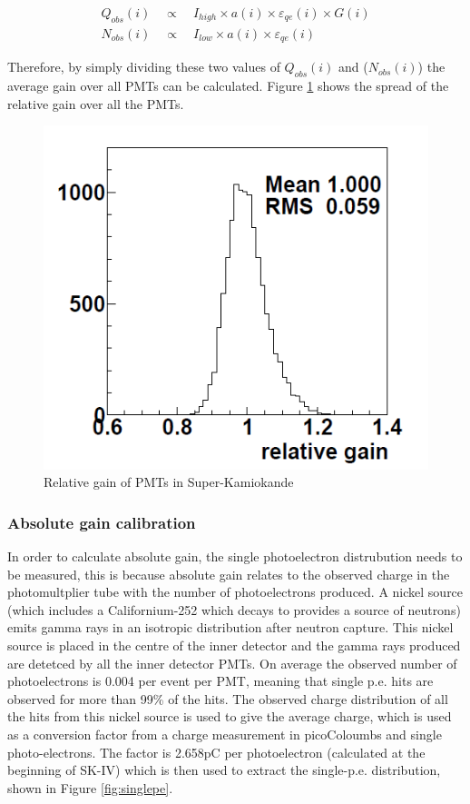 \begin{align}
Q_{o b s}(i) \quad \propto \quad I_{high} \times a(i) \times \varepsilon_{q e}(i) \times G(i) \\
N_{o b s}(i) \quad \propto \quad I_{low} \times a(i) \times \varepsilon_{q e}(i)
\end{align}
\label{eq:gaineq}

Therefore, by simply dividing these two values of $Q_{o b s}(i)$ and ($N_{o b s}(i)$) the average gain over all PMTs can be calculated.  Figure \ref{fig:relativegain} shows the spread of the relative gain over all the PMTs. 

\begin{figure}
    \includegraphics[width=\textwidth]{Figures/relativegain.png}
\caption{Relative gain of PMTs in Super-Kamiokande}
    \label{fig:relativegain}
\end{figure}

\subsubsection{Absolute gain calibration}

In order to calculate absolute gain, the single photoelectron distrubution needs to be measured, this is because absolute gain relates to the observed charge in the photomultplier tube with the number of photoelectrons produced. A nickel source (which includes a Californium-252 which decays to provides a source of neutrons) emits gamma rays in an isotropic distribution after neutron capture. This nickel source is placed in the centre of the inner detector and the gamma rays produced are detetced by all the inner detector PMTs. On average the observed number of photoelectrons is 0.004 per event per PMT, meaning that single p.e. hits are observed for more than 99\% of the hits. The observed charge distribution of all the hits from this nickel source is used to give the average charge, which is used as a conversion factor from a charge measurement in picoColoumbs and single photo-electrons. The factor is 2.658pC per photoelectron (calculated at the beginning of SK-IV) which is then used to extract the single-p.e. distribution, shown in Figure \ref{fig:singlepe}.

